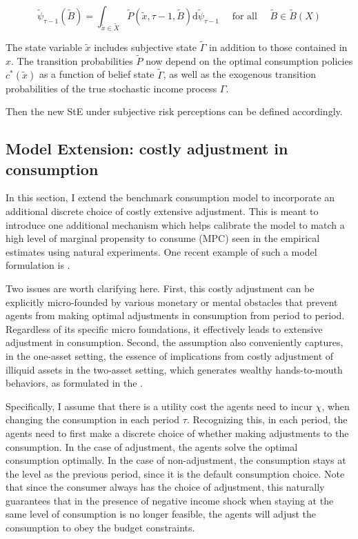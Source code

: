 \begin{equation}
\label{Eq:DistDynSub}
\tilde \psi_{\tau-1}(\tilde B)=\int_{\tilde x \in \tilde X} \tilde P(\tilde x, \tau-1, \tilde B) \mathrm{d} \tilde \psi_{\tau-1} \quad \text { for all } \quad \tilde B \in \tilde B(X)
\end{equation}

The state variable $\tilde x$ includes subjective state $\tilde \Gamma$ in addition to those contained in $x$. The transition probabilities $\tilde P$ now depend on the optimal consumption policies $c^*(\tilde x)$ as a function of belief state $\tilde \Gamma$, as well as the exogenous transition probabilities of the true stochastic income process $\Gamma$.  

Then the new StE under subjective risk perceptions can be defined accordingly. 


\subsection{Model Extension: costly adjustment in consumption}

In this section, I extend the benchmark consumption model to incorporate an additional discrete choice of costly extensive adjustment. This is meant to introduce one additional mechanism which helps calibrate the model to match a high level of marginal propensity to consume (MPC) seen in the empirical estimates using natural experiments. One recent example of such a model formulation is \cite{fuster2021would}. 

Two issues are worth clarifying here. First, this costly adjustment can be explicitly micro-founded by various monetary or mental obstacles that prevent agents from making optimal adjustments in consumption from period to period. Regardless of its specific micro foundations, it effectively leads to extensive adjustment in consumption. Second, the assumption also conveniently captures, in the one-asset setting, the essence of implications from costly adjustment of illiquid assets in the two-asset setting, which generates wealthy hands-to-mouth behaviors, as formulated in the \citep{kaplan2014model}. 


Specifically, I assume that there is a utility cost the agents need to incur $\chi$, when changing the consumption in each period $\tau$. Recognizing this, in each period, the agents need to first make a discrete choice of whether making adjustments to the consumption. In the case of adjustment, the agents solve the optimal consumption optimally. In the case of non-adjustment, the consumption stays at the level as the previous period, since it is the default consumption choice. Note that since the consumer always has the choice of adjustment, this naturally guarantees that in the presence of negative income shock when staying at the same level of consumption is no longer feasible, the agents will adjust the consumption to obey the budget constraints. 

